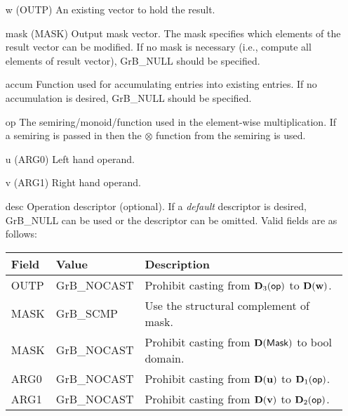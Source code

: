 \begin{itemize}[leftmargin=1.1in]
    \item[{\sf w}]     ({\sf OUTP}) An existing vector to hold the result.

    \item[{\sf mask}]  ({\sf MASK}) Output mask vector. The mask
    specifies which elements of the result vector can be modified.
    If no mask is necessary (i.e., compute all elements of result
    vector), {\sf GrB\_NULL} should be specified.

    \item[{\sf accum}]  Function used for accumulating entries into existing
                        entries. If no accumulation is desired, 
                        {\sf GrB\_NULL} should be specified.

    \item[{\sf op}]    The semiring/monoid/function used in the element-wise multiplication.
                       If a semiring is passed in then the $\otimes$  function from
                                    the semiring is used.
    \item[{\sf u}]     ({\sf ARG0}) Left hand operand.
    \item[{\sf v}]     ({\sf ARG1}) Right hand operand.

    \item[{\sf desc}]  Operation descriptor (optional). If a
    \emph{default} descriptor is desired, {\sf GrB\_NULL} can be
    used or the descriptor can be omitted. Valid fields are as follows: \\
    \begin{tabular}{lll}
    Field  & Value & Description \\
    \hline
    {\sf OUTP} & {\sf GrB\_NOCAST} & Prohibit casting from $\bold{D}_3({\sf op})$ to $\bold{D}({\bf w})$. \\
    {\sf MASK} & {\sf GrB\_SCMP} & Use the structural complement of {\sf mask}. \\
    {\sf MASK} & {\sf GrB\_NOCAST} & Prohibit casting from $\bold{D}({\sf Mask})$ to {\sf bool} domain. \\
    {\sf ARG0} & {\sf GrB\_NOCAST} & Prohibit casting from $\bold{D}({\bf u})$ to $\bold{D}_1({\sf op})$. \\
    {\sf ARG1} & {\sf GrB\_NOCAST} & Prohibit casting from $\bold{D}({\bf v})$ to $\bold{D}_2({\sf op})$. \\
    \end{tabular}
\end{itemize}

